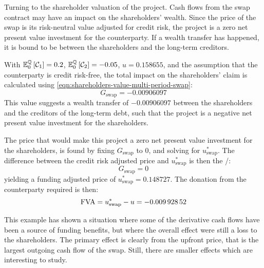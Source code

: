 \documentclass[main.tex]{subfiles}
\begin{document}
        Turning to the shareholder valuation of the project.
        Cash flows from the swap contract may have an impact on the shareholders' wealth.
        Since the price of the swap is its risk-neutral value adjusted for credit risk,
        the project is a zero net present value investment for the counterparty.
        If a wealth transfer has happened, it is bound to be between the shareholders and the long-term creditors.

        With $\mathbb{E}_{0}^{\mathbb{Q}}\left[\mathcal{C}_1\right]=\num{0.2}$,
        $\mathbb{E}_{0}^{\mathbb{Q}}\left[\mathcal{C}_2\right]=\num{-0.05}$,
        $u=\num{0.158655}$,
        and the assumption that the counterparty is credit risk-free,
        the total impact on the shareholders' claim is calculated using \cref{eqn:shareholders-value-multi-period-swap}:
        \begin{equation*}
            G_{\text{swap}} = \num{-0.00906097}
        \end{equation*}
        This value suggests a wealth transfer of $\num{-0.00906097}$
        between the shareholders and the creditors of the long-term debt,
        such that the project is a negative net present value investment for the shareholders.

        The price that would make this project a zero net present value investment for the shareholders,
        is found by fixing $G_{\text{swap}}$ to 0,
        and solving for $u^{\ast}_{\text{swap}}$.
        The difference between the credit risk adjusted price and $u^{\ast}_{\text{swap}}$ is then the \FVA/:
        \begin{equation*}
            G_{\text{swap}} = 0
        \end{equation*}
        yielding a funding adjusted price of $u^{\ast}_{\text{swap}} = \num{0.148727}$.
        The donation from the counterparty required is then:
        \begin{equation*}
            \FVA/ = u^{\ast}_{\text{swap}} - u = \num{-0.00992852}
        \end{equation*}

        This example has shown a situation where some of the derivative cash flows have
        been a source of funding benefits,
        but where the overall effect were still a loss to the shareholders.
        The primary effect is clearly from the upfront price,
        that is the largest outgoing cash flow of the swap.
        Still, there are smaller effects which are interesting to study.
\end{document}
